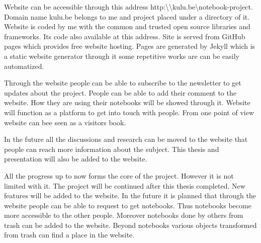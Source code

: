 
Website can be accessible through this address http:\textbackslash\textbackslash kulu.be\textbackslash notebook-project. Domain name kulu.be belongs to me and project placed under a directory of it. Website is coded by me with the common and trusted open source libraries and frameworks. Its code also available at this address. Site is served from GitHub pages which provides free website hosting. Pages are generated by Jekyll which is a static website generator through it some repetitive works are can be easily automatized. 

Through the website people can be able to subscribe to the newsletter to get updates about the project. People can be able to add their comment to the website. How they are using their notebooks will be showed through it. Website will function as a platform to get into touch with people. From one point of view website can bee seen as a visitors book.

In the future all the discussions and research can be moved to the website that people can reach more information about the subject. This thesis and presentation will also be added to the website. 

All the progress up to now forms the core of the project. However it is not limited with it. The project will be continued after this thesis completed. New features will be added to the website. In the future it is planned that through the website people can be able to request to get notebooks. Thus notebooks become more accessible to the other people. Moreover notebooks done by others from trash can be added to the website. Beyond notebooks various objects transformed from trash can find a place in the website.
